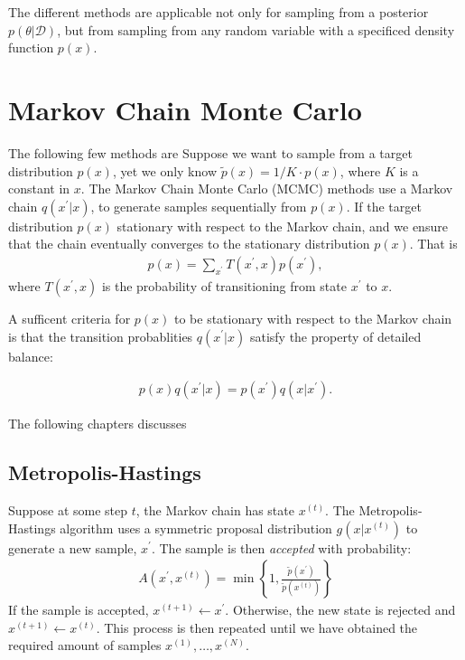 The different methods are applicable not only for sampling from a posterior $p(\theta | \mathcal{D})$, but from sampling from any random variable with a specificed density function $p(x)$.

\section{Markov Chain Monte Carlo}

The following few methods are 
Suppose we want to sample from a target distribution $p(x)$, yet we only know $\tilde{p}(x) = 1/K\cdot p(x)$, where $K$ is a constant in $x$.
The Markov Chain Monte Carlo (MCMC) methods use a Markov chain $q(x^\prime|x)$, to generate samples sequentially from $p(x)$. If the target distribution $p(x)$  stationary with respect to the Markov chain, and we ensure that the chain eventually converges to the stationary distribution $p(x)$. That is
\begin{align*}
    p(x) = \sum_{x^\prime} T(x^\prime, x) p(x^\prime),
\end{align*}
where $T(x^\prime, x)$ is the probability of transitioning from state $x^\prime$ to $x$.


A sufficent criteria for $p(x)$ to be stationary with respect to the Markov chain is that the transition probablities $q(x^\prime|x)$ satisfy the property of detailed balance:

\begin{align*}
    p(x)q(x^\prime|x) = p(x^\prime)q(x|x^\prime).
\end{align*}

The following chapters discusses



\subsection{Metropolis-Hastings}
Suppose at some step $t$, the Markov chain has state $x^{(t)}$. The Metropolis-Hastings algorithm uses a symmetric proposal distribution $g(x|x^{(t)})$ to generate a new sample, $x^\prime$. The sample is then \emph{accepted} with probability:
\begin{align*}
    A(x^{\prime}, x^{(t)}) = \min\left\{1, \frac{\tilde{p}(x^\prime)}{\tilde{p}(x^{(t)})}\right\}
\end{align*}
If the sample is accepted, $x^{(t+1)} \gets x^\prime$. Otherwise, the new state is rejected and $x^{(t+1)} \gets x^{(t)}$. This process is then repeated until we have obtained the required amount of samples $x^{(1)},\dots,x^{(N)}$. 

